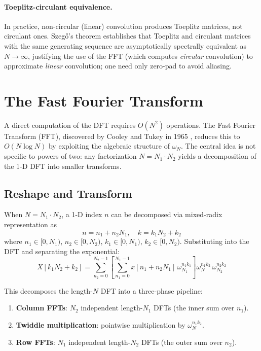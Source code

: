 \documentclass[12pt,a4paper]{report}
\theoremstyle{thms}
\theoremstyle{defns}
\begin{document}
\paragraph{Toeplitz-circulant equivalence.} In practice, non-circular (linear) convolution produces Toeplitz matrices, not circulant ones. Szeg\H{o}'s theorem \cite{szego_orthogonal, gray_toeplitz} establishes that Toeplitz and circulant matrices with the same generating sequence are asymptotically spectrally equivalent as $N \to \infty$, justifying the use of the FFT (which computes \textit{circular} convolution) to approximate \textit{linear} convolution; one need only zero-pad to avoid aliasing.

\section{The Fast Fourier Transform}
\label{sec:fft}

A direct computation of the DFT requires $O(N^2)$ operations. The Fast Fourier Transform (FFT), discovered by Cooley and Tukey in 1965 \cite{cooley_tukey}, reduces this to $O(N \log N)$ by exploiting the algebraic structure of $\omega_N$. The central idea is not specific to powers of two: any factorization $N = N_1 \cdot N_2$ yields a decomposition of the 1-D DFT into smaller transforms.

\subsection{Reshape and Transform}

When $N = N_1 \cdot N_2$, a 1-D index $n$ can be decomposed via mixed-radix representation as
\begin{equation}
    n = n_1 + n_2 N_1, \quad k = k_1 N_2 + k_2
\end{equation}
where $n_1 \in [0, N_1)$, $n_2 \in [0, N_2)$, $k_1 \in [0, N_1)$, $k_2 \in [0, N_2)$. Substituting into the DFT and separating the exponential:
\begin{equation}
    X[k_1 N_2 + k_2] = \sum_{n_2=0}^{N_2-1} \left[\sum_{n_1=0}^{N_1-1} x[n_1 + n_2 N_1]\, \omega_{N_1}^{n_1 k_1}\right] \omega_N^{n_1 k_2}\, \omega_{N_2}^{n_2 k_2}
\end{equation}

This decomposes the length-$N$ DFT into a three-phase pipeline:
\begin{enumerate}
    \item \textbf{Column FFTs}: $N_2$ independent length-$N_1$ DFTs (the inner sum over $n_1$).
    \item \textbf{Twiddle multiplication}: pointwise multiplication by $\omega_N^{n_1 k_2}$.
    \item \textbf{Row FFTs}: $N_1$ independent length-$N_2$ DFTs (the outer sum over $n_2$).
\end{enumerate}
\end{document}

